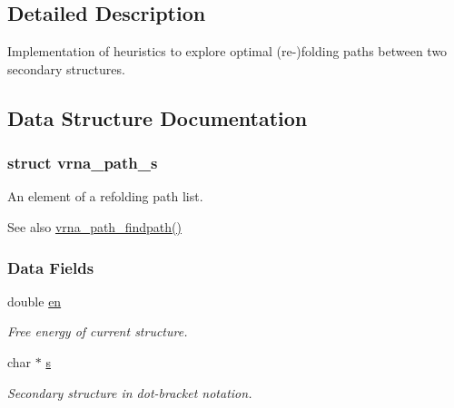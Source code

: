 \subsection{Detailed Description}
Implementation of heuristics to explore optimal (re-\/)folding paths between two secondary structures. 



\subsection{Data Structure Documentation}
\label{structvrna__path__s}
\hypertarget{group__direct__paths_structvrna__path__s}{}
\subsubsection{struct vrna\+\_\+path\+\_\+s}
An element of a refolding path list. 

\begin{DoxySeeAlso}{See also}
\hyperlink{group__direct__paths_ga5e1f97f58adc65016a8df88802dc16b5}{vrna\+\_\+path\+\_\+findpath()} 
\end{DoxySeeAlso}
\subsubsection*{Data Fields}
\begin{DoxyCompactItemize}
\item 
double \hyperlink{group__direct__paths_ac25160bf31d28097358278f367e41227}{en}\hypertarget{group__direct__paths_ac25160bf31d28097358278f367e41227}{}\label{group__direct__paths_ac25160bf31d28097358278f367e41227}

\begin{DoxyCompactList}\small\item\em Free energy of current structure. \end{DoxyCompactList}\item 
char $\ast$ \hyperlink{group__direct__paths_a141b70a59cb81d10bc65bbb7a0f6db77}{s}\hypertarget{group__direct__paths_a141b70a59cb81d10bc65bbb7a0f6db77}{}\label{group__direct__paths_a141b70a59cb81d10bc65bbb7a0f6db77}

\begin{DoxyCompactList}\small\item\em Secondary structure in dot-\/bracket notation. \end{DoxyCompactList}\end{DoxyCompactItemize}


